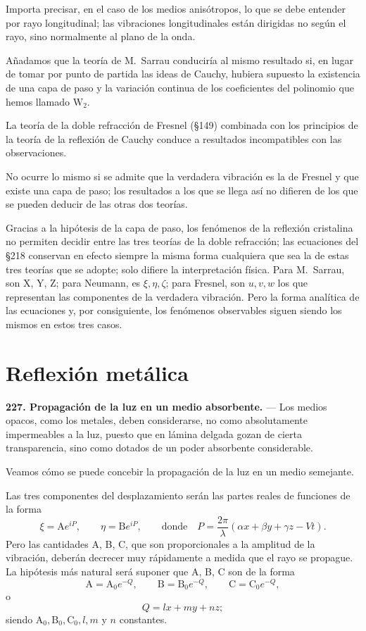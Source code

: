 Importa precisar, en el caso de los medios anisótropos, lo que se debe
entender por rayo longitudinal; las vibraciones longitudinales están
dirigidas no según el rayo, sino normalmente al plano de la onda.

Añadamos que la teoría de M.~Sarrau conduciría al mismo resultado si, en
lugar de tomar por punto de partida las ideas de Cauchy, hubiera supuesto
la existencia de una capa de paso y la variación continua de los
coeficientes del polinomio que hemos llamado $\mathrm{W}_2$.

La teoría de la doble refracción de Fresnel (§149) combinada con los
principios de la teoría de la reflexión de Cauchy conduce a resultados
incompatibles con las observaciones.

No ocurre lo mismo si se admite que la verdadera vibración es la de
Fresnel y que existe una capa de paso; los resultados a los que se llega
así no difieren de los que se pueden deducir de las otras dos teorías.

Gracias a la hipótesis de la capa de paso, los fenómenos de la reflexión
cristalina no permiten decidir entre las tres teorías de la doble
refracción; las ecuaciones del §218 conservan en efecto siempre la
misma forma cualquiera que sea la de estas tres teorías que se adopte;
solo difiere la interpretación física. Para M.~Sarrau, son X, Y, Z; para
Neumann, es $\xi,\eta,\zeta$; para Fresnel, son $u,v,w$ los que
representan las componentes de la verdadera vibración. Pero la forma
analítica de las ecuaciones y, por consiguiente, los fenómenos
observables siguen siendo los mismos en estos tres casos.

\section{Reflexión metálica}
\label{sec:reflexion-metalica}

\noindent\textbf{227. Propagación de la luz en un medio absorbente.} —
Los medios opacos, como los metales, deben considerarse, no como
absolutamente impermeables a la luz, puesto que en lámina delgada gozan
de cierta transparencia, sino como dotados de un poder absorbente
considerable.

Veamos cómo se puede concebir la propagación de la luz en un medio
semejante.

Las tres componentes del desplazamiento serán las partes reales de
funciones de la forma
\[
\xi=\mathrm{A}e^{iP},\qquad \eta=\mathrm{B}e^{iP},\qquad
\text{donde}\quad P=\frac{2\pi}{\lambda}(\alpha x+\beta y+\gamma z-Vt).
\]
Pero las cantidades A, B, C, que son proporcionales a la amplitud de la
vibración, deberán decrecer muy rápidamente a medida que el rayo se
propague. La hipótesis más natural será suponer que A, B, C son de la
forma
\[
\mathrm{A}=\mathrm{A}_0e^{-Q},\qquad \mathrm{B}=\mathrm{B}_0e^{-Q},
\qquad \mathrm{C}=\mathrm{C}_0e^{-Q},
\]
o
\[
Q=lx+my+nz;
\]
siendo $\mathrm{A}_0,\mathrm{B}_0,\mathrm{C}_0,l,m$ y $n$ constantes.

